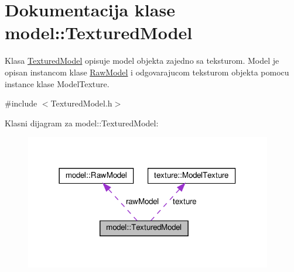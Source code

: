 \hypertarget{classmodel_1_1TexturedModel}{}\section{Dokumentacija klase model\+:\+:Textured\+Model}
\label{classmodel_1_1TexturedModel}


Klasa \hyperlink{classmodel_1_1TexturedModel}{Textured\+Model} opisuje model objekta zajedno sa teksturom. Model je opisan instancom klase \hyperlink{classmodel_1_1RawModel}{Raw\+Model} i odgovarajucom teksturom objekta pomocu instance klase Model\+Texture.  




{\ttfamily \#include $<$Textured\+Model.\+h$>$}



Klasni dijagram za model\+:\+:Textured\+Model\+:
\nopagebreak
\begin{figure}[H]
\begin{center}
\leavevmode
\includegraphics[width=306pt]{classmodel_1_1TexturedModel__coll__graph}
\end{center}
\end{figure}
